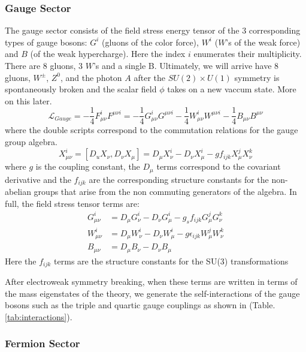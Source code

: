 \subsubsection{Gauge Sector}

The gauge sector consists of the field stress energy tensor of the 3 corresponding types of gauge bosons:
 $G^i$ (gluons of the color force), $W^i$ ($W$'s of the weak force) and $B$ (of the weak hypercharge). Here the index $i$ enumerates their multiplicity. There are 8 gluons, 3 $W$'s and a single B. Ultimately, we will arrive have 8 gluons, $W^{\pm}$, $Z^0$, and the photon $A$ after the $SU(2)\times U(1)$ symmetry is spontaneously broken 
and the scalar field $\phi$ takes on a new vaccum state. More on this later.
\begin{equation}
\mathcal{L}_{Gauge} = - \frac{1}{4} F_{\mu\nu}^{i} F^{\mu\nu i} =  - \frac{1}{4} G_{\mu\nu}^{i} G^{\mu\nu i} - \frac{1}{4} W^{i}_{\mu\nu} W^{\mu\nu i} - \frac{1}{4} B_{\mu\nu}B^{\mu\nu} 
\end{equation}
where the double scripts correspond to the commutation relations for the gauge group algebra. 
\begin{equation}
X_{\mu\nu}^i   = [D_u X_\nu, D_\nu X_\mu] = D_\mu X_\nu^i - D_\nu X_\mu^i - g f_{ijk} X_\mu^j X_\nu^k
\end{equation}
where $g$ is the coupling constant, the $D_\mu$ terms correspond to the covariant derivative and the $f_{ijk}$ are the corresponding structure constants for the non-abelian groups that arise from the non commuting generators of the algebra. In full, the field stress tensor terms are:
\begin{align*}
G_{\mu\nu}^i &=  D_\mu G_\nu^i - D_\nu G_\mu^i - g_s f_{ijk} G_\mu^j G_\nu^k\\ 
W_{\mu\nu}^i &=  D_\mu W_\nu^i - D_\nu W_\mu^i - g \epsilon_{ijk} W_\mu^j W_\nu^k\\ 
B_{\mu\nu} &=  D_\mu B_\nu - D_\nu B_\mu
\end{align*}
Here the  $f_{ijk}$ terms are the structure constants for the SU(3) transformations 

After electroweak symmetry breaking, when these terms are written in terms of the mass eigenstates of the theory, we generate the self-interactions of the gauge bosons such as the triple and quartic gauge couplings as 
shown in (Table. \ref{tab:interactions}). 

\subsubsection{Fermion Sector}

